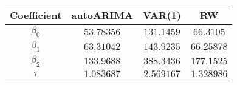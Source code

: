
\begin{comment}
     Здесь везде autoARIMA имеет порядок (0,0,0), кроме b2, там (1,0,0). Те в нашей фильтрации коэыыициенты модели - мартингалы.
\end{comment}

\begin{tabular}{|c | c c c|} 
    \hline
    Coefficient & autoARIMA & VAR(1) & RW \\ [0.5ex] 
    \hline
    $\beta_0$ & $53.78356$ & $131.1459$ & $66.3105$ \\ 
    \hline
    $\beta_1$ & $63.31042$ & $143.9235$ & $66.25878$ \\
    \hline
    $\beta_2$ & $133.9688$ & $388.3436$ & $177.1525$ \\
    \hline
    $\tau$ & $1.083687$ & $2.569167$ & $1.328986$ \\
    \hline
\end{tabular}